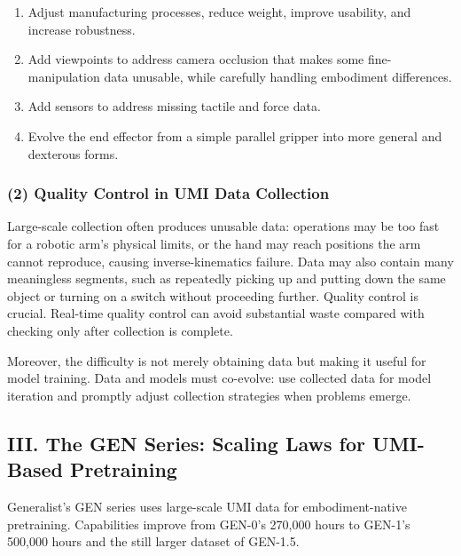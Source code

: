 \begin{enumerate}
\def\labelenumi{\arabic{enumi}.}
\item
  Adjust manufacturing processes, reduce weight, improve usability, and increase robustness.
\item
  Add viewpoints to address camera occlusion that makes some fine-manipulation data unusable, while carefully handling embodiment differences.
\item
  Add sensors to address missing tactile and force data.
\item
  Evolve the end effector from a simple parallel gripper into more general and dexterous forms.
\end{enumerate}

\hypertarget{quality-control-in-umi-data-collection}{%
\subsubsection{(2) Quality Control in UMI Data Collection}\label{quality-control-in-umi-data-collection}}

Large-scale collection often produces unusable data: operations may be too fast for a robotic arm's physical limits, or the hand may reach positions the arm cannot reproduce, causing inverse-kinematics failure. Data may also contain many meaningless segments, such as repeatedly picking up and putting down the same object or turning on a switch without proceeding further. Quality control is crucial. Real-time quality control can avoid substantial waste compared with checking only after collection is complete.

Moreover, the difficulty is not merely obtaining data but making it useful for model training. Data and models must co-evolve: use collected data for model iteration and promptly adjust collection strategies when problems emerge.

\hypertarget{iii.-the-gen-series-scaling-laws-for-umi-based-pretraining}{%
\subsection{III. The GEN Series: Scaling Laws for UMI-Based Pretraining}\label{iii.-the-gen-series-scaling-laws-for-umi-based-pretraining}}

Generalist's GEN series uses large-scale UMI data for embodiment-native pretraining. Capabilities improve from GEN-0's 270,000 hours to GEN-1's 500,000 hours and the still larger dataset of GEN-1.5.

